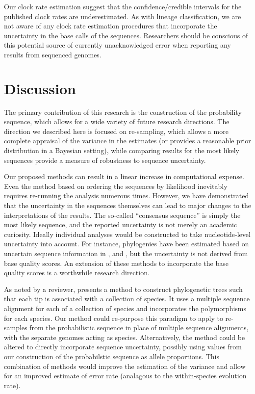 \documentclass[12pt]{article}
\begin{document}
Our clock rate estimation suggest that the confidence/credible intervals for the published clock rates are underestimated.
As with lineage classification, we are not aware of any clock rate estimation procedures that incorporate the uncertainty in the base calls of the sequences.
Researchers should be conscious of this potential source of currently unacknowledged error when reporting any results from sequenced genomes.

\section{Discussion}

The primary contribution of this research is the construction of the probability sequence, which allows for a wide variety of future research directions.
The direction we described here is focused on re-sampling, which allows a more complete appraisal of the variance in the estimates (or provides a reasonable prior distribution in a Bayesian setting), while comparing results for the most likely sequences provide a measure of robustness to sequence uncertainty.

Our proposed methods can result in a linear increase in computational expense.
Even the method based on ordering the sequences by likelihood inevitably requires re-running the analysis numerous times.
However, we have demonstrated that the uncertainty in the sequences themselves can lead to major changes to the interpretations of the results.
The so-called ``consensus sequence'' is simply the most likely sequence, and the reported uncertainty is not merely an academic curiosity.
Ideally individual analyses would be constructed to take nucleotide-level uncertainty into account.
For instance, phylogenies have been estimated based on uncertain sequence information in \cite{rossOncoNEMInferringTumor2016}, \cite{jahnTreeInferenceSinglecell2016} and \cite{zafarSiFitInferringTumor2017}, but the uncertainty is not derived from base quality scores.
An extension of these methods to incorporate the base quality scores is a worthwhile research direction.

As noted by a reviewer, \cite{demaioLinkingGreatApes2013} presents a method to construct phylogenetic trees such that each tip is associated with a collection of species.
It uses a multiple sequence alignment for each of a collection of species and incorporates the polymorphisms for each species.
Our method could re-purpose this paradigm to apply to re-samples from the probabilistic sequence in place of multiple sequence alignments, with the separate genomes acting as species.
Alternatively, the method could be altered to directly incorporate sequence uncertainty, possibly using values from our construction of the probabilstic sequence as allele proportions.
This combination of methods would improve the estimation of the variance and allow for an improved estimate of error rate (analagous to the within-species evolution rate).
\end{document}
